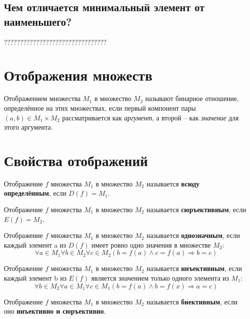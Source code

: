 \documentclass[a4paper]{article}
\begin{document}
{\begin{small}
\subsection*{Чем отличается минимальный элемент от наименьшего?}
????????????????????????????????

\section*{Отображения множеств
}

Отображением
множества $M_1$ в множество $M_2$ называют бинарное отношение, определённое на
этих множествах, если первый компонент пары $(a, b) \in M_1 \times M_2$ рассматривается как \textit{аргумент}, а второй – как \textit{значение} для этого аргумента.

\section*{Свойства отображений}

Отображение $f$ множества $M_1$ в множество $M_2$ называется
\textbf{всюду определённым}, если $D(f) = M_1$.

Отображение $f$ множества $M_1$ в множество $M_2$ называется
\textbf{сюръективным}, если $E(f) = M_2$. 

Отображение $f$ множества $M_1$ в множество $M_2$ называется
\textbf{однозначным}, если каждый элемент a из $D(f)$ имеет ровно одно значения в множестве $M_2$:
\begin{equation}
\forall a \in M_1 \forall b \in M_2 \forall c \in M_2 (b  = f(a) \land c = f(a) \Rightarrow b = c)
\end{equation}


Отображение $f$ множества $M_1$ в множество $M_2$ называется
\textbf{инъективным}, если каждый элемент b из $E(f)$ является значением только одного элемента из $M_1$:
\begin{equation}
\forall b \in M_2 \forall a \in M_1 \forall c \in M_1 (b = f(a) \land b = f(x) \Rightarrow a = c)
\end{equation}

Отображение $f$ множества $M_1$ в множество $M_2$ называется
\textbf{биективным}, если оно \textbf{инъективно и сюръективно}. 


\end{small}}
\end{document}
